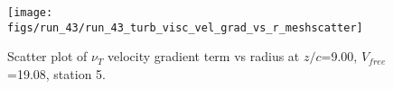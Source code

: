 \begin{figure}[H]
\centering
\texttt{[image: figs/run\_43/run\_43\_turb\_visc\_vel\_grad\_vs\_r\_meshscatter]}
\caption{Scatter plot of $\nu_T$ velocity gradient term vs radius at $z/c$=9.00, $V_{free}$=19.08, station 5.}
\label{fig:run_43_turb_visc_vel_grad_vs_r_meshscatter}
\end{figure}


